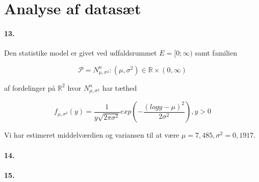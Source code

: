 \section{Analyse af datasæt}

\paragraph{13.}
Den statistike model er givet ved udfaldsrummet $E=[0; \infty)$ samt
familien

\begin{equation*}
  \mathcal{P} = N^n_{\mu,\sigma^2} : (\mu, \sigma^2) \in \mathbb{R}
  \times (0, \infty)
\end{equation*}

af fordelinger på $\mathbb{R}^2$ hvor $N^n_{\mu, \sigma^2}$ har tæthed

\begin{equation*}
  f_{\mu, \sigma^2}(y) = \frac{1}{y \sqrt{2\pi\sigma^2}} exp ( -
  \frac{(log y - \mu)^2}{2\sigma^2} ), y>0
\end{equation*}

Vi har estimeret middelværdien og variansen til at være $\mu = 7,485 ,
\sigma^2 = 0,1917$.


\paragraph{14.}


\paragraph{15.}
